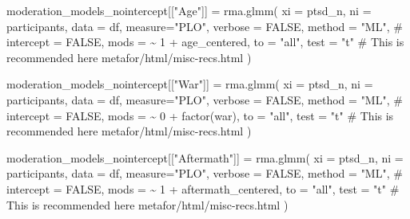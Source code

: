 \documentclass[
  letterpaper,
  DIV=11,
  numbers=noendperiod]{scrartcl}
\newenvironment{Shaded}{\begin{snugshade}}{\end{snugshade}}
\newcommand{\AttributeTok}[1]{\textcolor[rgb]{0.40,0.45,0.13}{#1}}
\newcommand{\CommentTok}[1]{\textcolor[rgb]{0.37,0.37,0.37}{#1}}
\newcommand{\ConstantTok}[1]{\textcolor[rgb]{0.56,0.35,0.01}{#1}}
\newcommand{\DecValTok}[1]{\textcolor[rgb]{0.68,0.00,0.00}{#1}}
\newcommand{\FunctionTok}[1]{\textcolor[rgb]{0.28,0.35,0.67}{#1}}
\newcommand{\NormalTok}[1]{\textcolor[rgb]{0.00,0.23,0.31}{#1}}
\newcommand{\OtherTok}[1]{\textcolor[rgb]{0.00,0.23,0.31}{#1}}
\newcommand{\SpecialCharTok}[1]{\textcolor[rgb]{0.37,0.37,0.37}{#1}}
\newcommand{\StringTok}[1]{\textcolor[rgb]{0.13,0.47,0.30}{#1}}
\begin{document}
\begin{Shaded}
\begin{Highlighting}[]
\NormalTok{moderation\_models\_nointercept[[}\StringTok{"Age"}\NormalTok{]] }\OtherTok{=} \FunctionTok{rma.glmm}\NormalTok{(}
  \AttributeTok{xi =} \StringTok{\textasciigrave{}}\AttributeTok{ptsd\_n}\StringTok{\textasciigrave{}}\NormalTok{, }
  \AttributeTok{ni =} \StringTok{\textasciigrave{}}\AttributeTok{participants}\StringTok{\textasciigrave{}}\NormalTok{, }
  \AttributeTok{data =}\NormalTok{ df, }
  \AttributeTok{measure=}\StringTok{"PLO"}\NormalTok{,}
  \AttributeTok{verbose =} \ConstantTok{FALSE}\NormalTok{,}
  \AttributeTok{method =} \StringTok{"ML"}\NormalTok{,}
  \CommentTok{\# intercept = FALSE,}
  \AttributeTok{mods =} \SpecialCharTok{\textasciitilde{}} \DecValTok{1} \SpecialCharTok{+}\NormalTok{ age\_centered,}
  \AttributeTok{to =} \StringTok{"all"}\NormalTok{,}
  \AttributeTok{test =} \StringTok{"t"} \CommentTok{\# This is recommended here metafor/html/misc{-}recs.html}
\NormalTok{)}

\NormalTok{moderation\_models\_nointercept[[}\StringTok{"War"}\NormalTok{]] }\OtherTok{=} \FunctionTok{rma.glmm}\NormalTok{(}
  \AttributeTok{xi =} \StringTok{\textasciigrave{}}\AttributeTok{ptsd\_n}\StringTok{\textasciigrave{}}\NormalTok{, }
  \AttributeTok{ni =} \StringTok{\textasciigrave{}}\AttributeTok{participants}\StringTok{\textasciigrave{}}\NormalTok{, }
  \AttributeTok{data =}\NormalTok{ df, }
  \AttributeTok{measure=}\StringTok{"PLO"}\NormalTok{,}
  \AttributeTok{verbose =} \ConstantTok{FALSE}\NormalTok{,}
  \AttributeTok{method =} \StringTok{"ML"}\NormalTok{,}
  \CommentTok{\# intercept = FALSE,}
  \AttributeTok{mods =} \SpecialCharTok{\textasciitilde{}} \DecValTok{0} \SpecialCharTok{+} \FunctionTok{factor}\NormalTok{(war),}
  \AttributeTok{to =} \StringTok{"all"}\NormalTok{,}
  \AttributeTok{test =} \StringTok{"t"} \CommentTok{\# This is recommended here metafor/html/misc{-}recs.html}
\NormalTok{)}

\NormalTok{moderation\_models\_nointercept[[}\StringTok{"Aftermath"}\NormalTok{]] }\OtherTok{=} \FunctionTok{rma.glmm}\NormalTok{(}
  \AttributeTok{xi =} \StringTok{\textasciigrave{}}\AttributeTok{ptsd\_n}\StringTok{\textasciigrave{}}\NormalTok{, }
  \AttributeTok{ni =} \StringTok{\textasciigrave{}}\AttributeTok{participants}\StringTok{\textasciigrave{}}\NormalTok{, }
  \AttributeTok{data =}\NormalTok{ df, }
  \AttributeTok{measure=}\StringTok{"PLO"}\NormalTok{,}
  \AttributeTok{verbose =} \ConstantTok{FALSE}\NormalTok{,}
  \AttributeTok{method =} \StringTok{"ML"}\NormalTok{,}
  \CommentTok{\# intercept = FALSE,}
  \AttributeTok{mods =} \SpecialCharTok{\textasciitilde{}} \DecValTok{1} \SpecialCharTok{+}\NormalTok{ aftermath\_centered,}
  \AttributeTok{to =} \StringTok{"all"}\NormalTok{,}
  \AttributeTok{test =} \StringTok{"t"} \CommentTok{\# This is recommended here metafor/html/misc{-}recs.html}
\NormalTok{)}
\end{Highlighting}
\end{Shaded}
\end{document}
